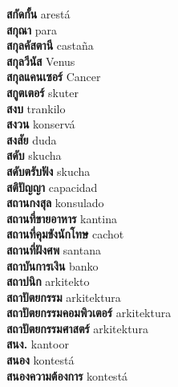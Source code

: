 \textbf{ สกัดกั้น  } arestá \\
\textbf{ สกุณา  } para \\
\textbf{ สกุลคัสตานี  } castaña \\
\textbf{ สกุลวีนัส  } Venus \\
\textbf{ สกุลแคนเซอร์  } Cancer \\
\textbf{ สกูตเตอร์  } skuter \\
\textbf{ สงบ  } trankilo \\
\textbf{ สงวน  } konservá \\
\textbf{ สงสัย  } duda \\
\textbf{ สดับ  } skucha \\
\textbf{ สดับตรับฟัง  } skucha \\
\textbf{ สติปัญญา  } capacidad \\
\textbf{ สถานกงสุล  } konsulado \\
\textbf{ สถานที่ขายอาหาร  } kantina \\
\textbf{ สถานที่คุมขังนักโทษ  } cachot \\
\textbf{ สถานที่ฝังศพ  } santana \\
\textbf{ สถาบันการเงิน  } banko \\
\textbf{ สถาปนิก  } arkitekto \\
\textbf{ สถาปัตยกรรม  } arkitektura \\
\textbf{ สถาปัตยกรรมคอมพิวเตอร์  } arkitektura \\
\textbf{ สถาปัตยกรรมศาสตร์  } arkitektura \\
\textbf{ สนง.  } kantoor \\
\textbf{ สนอง  } kontestá \\
\textbf{ สนองความต้องการ  } kontestá \\
